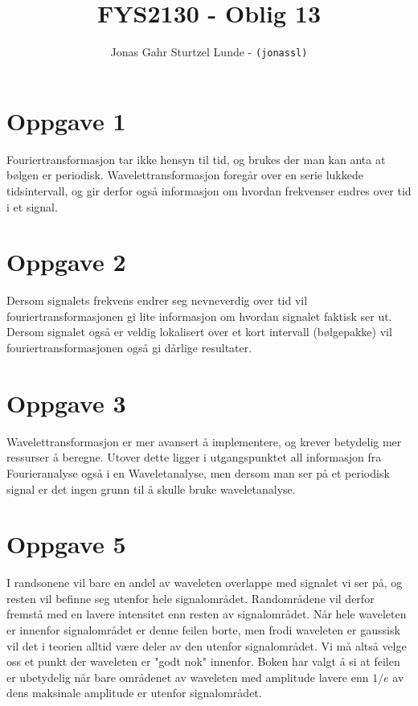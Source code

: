 \documentclass[11pt,norsk]{article}
\begin{document}
\renewcommand{\exp}{\mathrm{e}^}

\title{FYS2130 - Oblig 13}
\author{
		Jonas Gahr Sturtzel Lunde - \texttt{(jonassl)}
		}
\maketitle
\pagebreak


\section*{Oppgave 1}
Fouriertransformasjon tar ikke hensyn til tid, og brukes der man kan anta at bølgen er periodisk. Wavelettransformasjon foregår over en serie lukkede tidsintervall, og gir derfor også informasjon om hvordan frekvenser endres over tid i et signal.


\section*{Oppgave 2}
Dersom signalets frekvens endrer seg nevneverdig over tid vil fouriertransformasjonen gi lite informasjon om hvordan signalet faktisk ser ut. Dersom signalet også er veldig lokalisert over et kort intervall (bølgepakke) vil fouriertransformasjonen også gi dårlige resultater.


\section*{Oppgave 3}
Wavelettransformasjon er mer avansert å implementere, og krever betydelig mer ressurser å beregne. Utover dette ligger i utgangspunktet all informasjon fra Fourieranalyse også i en Waveletanalyse, men dersom man ser på et periodisk signal er det ingen grunn til å skulle bruke waveletanalyse.


\section*{Oppgave 5}
I randsonene vil bare en andel av waveleten overlappe med signalet vi ser på, og resten vil befinne seg utenfor hele signalområdet. Randområdene vil derfor fremstå med en lavere intensitet enn resten av signalområdet. Når hele waveleten er innenfor signalområdet er denne feilen borte, men frodi waveleten er gaussisk vil det i teorien alltid være deler av den utenfor signalområdet. Vi må altså velge oss et punkt der waveleten er "godt nok" innenfor. Boken har valgt å si at feilen er ubetydelig når bare områdenet av waveleten med amplitude lavere enn $1/e$ av dens maksinale amplitude er utenfor signalområdet.
\end{document}
